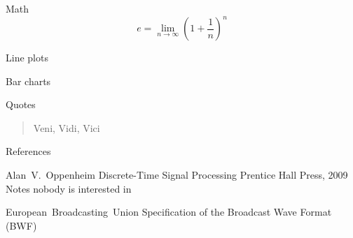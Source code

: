 \documentclass[10pt]{beamer}
\begin{document}
\begin{frame}{Math}
  \begin{equation*}
    e = \lim_{n\to \infty} \left(1 + \frac{1}{n}\right)^n
  \end{equation*}
\end{frame}
\begin{frame}{Line plots}
  \begin{figure}
  \end{figure}
\end{frame}
\begin{frame}{Bar charts}
  \begin{figure}
  \end{figure}
\end{frame}
\begin{frame}{Quotes}
  \begin{quote}
    Veni, Vidi, Vici
  \end{quote}
\end{frame}

\begin{frame}{References}
	\begin{thebibliography}{10}

	\beamertemplatebookbibitems
	Alan~V.~Oppenheim
	\newblock Discrete-Time Signal Processing
	\newblock Prentice Hall Press, 2009
	\newblock Notes nobody is interested in

	\beamertemplatearticlebibitems
	European~Broadcasting~Union
	\newblock Specification of the Broadcast Wave Format (BWF)
  \end{thebibliography}
\end{frame}
\end{document}
